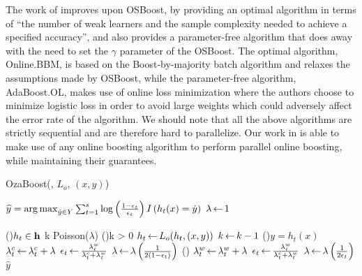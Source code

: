 The work of \citet{Beygelzimer2015optimal} improves upon OSBoost,
by providing an optimal algorithm in terms of ``the number of weak learners
and the sample complexity needed to achieve a specified accuracy'', and also provides
a parameter-free algorithm that does away with the need to set the $\gamma$
parameter of the OSBoost.
The optimal algorithm, Online.BBM, is based on the Boost-by-majority batch
algorithm \cite{batch-bbm} and relaxes the assumptions made by OSBoost,
while the parameter-free algorithm, AdaBoost.OL, makes use of online
loss minimization where the authors choose to minimize logistic loss
in order to avoid large weights which could adversely affect the
error rate of the algorithm.
We should note that all the above algorithms are strictly sequential
and are therefore hard to parallelize.
Our work in \boostvht is able to
make use of any online boosting algorithm to perform
parallel online boosting, while maintaining their guarantees.


\begin{algorithm}
	\small
	\caption{OzaBoost(\ensemble, $L_o$, $(x,y)$)}
	\label{alg:ozaboost}
	 \;
	$\widehat{y} = \operatorname*{arg\,max}_{\dot{y} \in Y} \sum_{t = 1}^{s} \log \left( \frac{1-\epsilon_t}{\epsilon_t} \right) I\left( h_t(x) = \dot{y} \right)$ \;
	 \;
	$\lambda {\,\leftarrow\,} 1$\;

	\ForEach(){$h_t \in \mathbf{h}$}{
		k  Poisson($\lambda$) \;
		\While(){k > 0}{
			$h_t {\,\leftarrow\,} L_o(h_t, (x,y))$ \;
			$k {\,\leftarrow\,} k-1$ \;
		}
		\If(){$y = h_t(x)$}{
			$\lambda^c_t {\,\leftarrow\,} \lambda^c_t + \lambda$ \;
			$\epsilon_t {\,\leftarrow\,} \frac{\lambda^w_t}{\lambda^c_t + \lambda^w_t}$ \;
			$\lambda {\,\leftarrow\,} \lambda \left( \frac{1}{2(1 - \epsilon_t)} \right)$ \;
		}\Else(){
			$\lambda^w_t {\,\leftarrow\,} \lambda^w_t + \lambda$ \;
			$\epsilon_t {\,\leftarrow\,} \frac{\lambda^w_t}{\lambda^c_t + \lambda^w_t}$ \;
			$\lambda {\,\leftarrow\,} \lambda \left( \frac{1}{2 \epsilon_t} \right)$ \;
		}
	}
	\Return $\widehat{y}$ \;
\end{algorithm}



